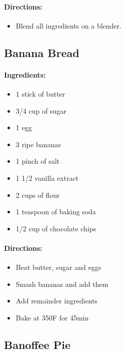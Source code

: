 \documentclass{article}
\begin{document}
\paragraph{Directions:}
\begin{itemize}
    \item Blend all ingredients on a blender.
\end{itemize}

\subsection{Banana Bread}

\paragraph{Ingredients:}
\begin{itemize}
    \item 1 stick of butter
    \item 3/4 cup of sugar
    \item 1 egg
    \item 3 ripe bananas
    \item 1 pinch of salt
    \item 1 1/2 vanilla extract
    \item 2 cups of flour
    \item 1 teaspoon of baking soda
    \item 1/2 cup of chocolate chips
\end{itemize}

\paragraph{Directions:}
\begin{itemize}
    \item Beat butter, sugar and eggs
    \item Smash bananas and add them
    \item Add remainder ingredients
    \item Bake at 350F for 45min
\end{itemize}

\subsection{Banoffee Pie} 
\end{document}

